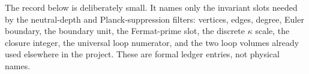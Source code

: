 \documentclass[11pt]{article}
\begin{document}
The record below is deliberately small.  It names only the invariant
slots needed by the neutral-depth and Planck-suppression filters:
vertices, edges, degree, Euler boundary, the boundary unit, the
Fermat-prime slot, the discrete $\kappa$ scale, the closure integer, the
universal loop numerator, and the two loop volumes already used
elsewhere in the project.  These are formal ledger entries, not physical
names.

\begin{code}%
\>[0]\<%
\\
\>[0]\AgdaSpace{}%
\AgdaSpace{}%
\AgdaSymbol{:}\AgdaSpace{}%
\AgdaSpace{}%
\<%
\\
\>[0][@{}l@{\AgdaIndent{0}}]%
\>[2]\<%
\\
\>[2][@{}l@{\AgdaIndent{0}}]%
\>[4]%
\>[19]\AgdaSymbol{:}\AgdaSpace{}%
\<%
\\
%
\>[4]%
\>[19]\AgdaSymbol{:}\AgdaSpace{}%
\<%
\\
%
\>[4]%
\>[19]\AgdaSymbol{:}\AgdaSpace{}%
\<%
\\
%
\>[4]%
\>[19]\AgdaSymbol{:}\AgdaSpace{}%
\<%
\\
%
\>[4]%
\>[19]\AgdaSymbol{:}\AgdaSpace{}%
\<%
\\
%
\>[4]%
\>[19]\AgdaSymbol{:}\AgdaSpace{}%
\<%
\\
%
\>[4]%
\>[19]\AgdaSymbol{:}\AgdaSpace{}%
\<%
\\
%
\>[4]\AgdaSpace{}%
\AgdaSymbol{:}\AgdaSpace{}%
\<%
\\
%
\>[4]%
\>[19]\AgdaSymbol{:}\AgdaSpace{}%
\<%
\\
%
\>[4]%
\>[19]\AgdaSymbol{:}\AgdaSpace{}%
\<%
\\
%
\>[4]%
\>[19]\AgdaSymbol{:}\AgdaSpace{}%
\<%
\\
%
\>[4]\AgdaSpace{}%
\AgdaSymbol{:}\AgdaSpace{}%
\<%
\\
%
\\[\AgdaEmptyExtraSkip]%
\>[0]\AgdaSpace{}%
\AgdaSymbol{:}\AgdaSpace{}%

\end{code}
\end{document}

